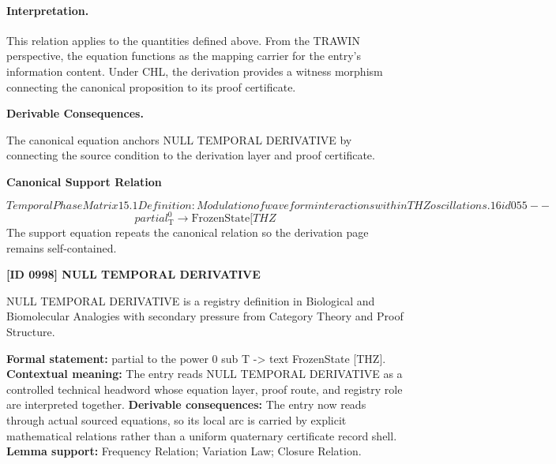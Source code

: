 \paragraph{Interpretation.}
This relation applies to the quantities defined above. From the TRAWIN perspective, the equation functions as the mapping carrier for the entry’s information content. Under CHL, the derivation provides a witness morphism connecting the canonical proposition to its proof certificate.

\par\vspace{0.35em}
\noindent\textbf{Derivable Consequences.}\quad
\begingroup
\footnotesize
\raggedright
The canonical equation anchors NULL TEMPORAL DERIVATIVE by connecting the source condition to the derivation layer and proof certificate.
\par\endgroup

\noindent\textbf{Canonical Support Relation}\par
\[
Temporal Phase Matrix 15.1 Definition: Modulation of waveform interactions within THZ oscillations. 16 id055--
\]
\[
partial^0_{\mathrm{T}} \to \text{FrozenState}[THZ
\]
\noindent The support equation repeats the canonical relation so the derivation page remains self-contained.\par

\clearpage
\noindent\textbf{[ID 0998] NULL TEMPORAL DERIVATIVE}\par
\vspace{0.35em}
\begingroup\small
{}
NULL TEMPORAL DERIVATIVE is a registry definition in Biological and Biomolecular Analogies with secondary pressure from Category Theory and Proof Structure.

\begingroup\footnotesize\setlength{\emergencystretch}{3em}\sloppy
\textbf{Formal statement:} partial to the power 0 sub T -> text FrozenState [THZ]. \textbf{Contextual meaning:} The entry reads NULL TEMPORAL DERIVATIVE as a controlled technical headword whose equation layer, proof route, and registry role are interpreted together. \textbf{Derivable consequences:} The entry now reads through actual sourced equations, so its local arc is carried by explicit mathematical relations rather than a uniform quaternary certificate record shell. \textbf{Lemma support:} Frequency Relation; Variation Law; Closure Relation.\par
\endgroup

